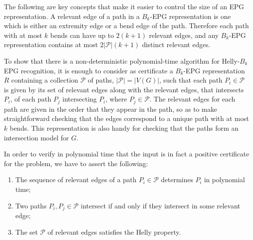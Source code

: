 \documentclass[
submission
]{dmtcs-episciences}
\begin{document}


The following are key concepts that make it easier to control the size of an EPG representation. A relevant edge of a path in a $B_k$-EPG representation is one which is either an extremity edge or a bend edge of the path. Therefore each path with at most $k$ bends can have up to $2(k + 1)$ relevant edges, and any $B_k$-EPG representation contains at most $2|\mathcal{P}|(k + 1)$ distinct relevant edges. 

To show that there is a non-deterministic polynomial-time algorithm for {\sc Helly-$B_k$ EPG recognition}, it is enough to consider as certificate a  $B_k$-EPG representation $R$ containing a collection $\mathcal{P}$ of paths, $|\mathcal{P}| = |V(G)|$, such that  each path $P_i \in \mathcal{P}$ is given by its set of relevant edges along with the relevant edges, that intersects $P_i$, of each path $P_j$ intersecting $P_i$, where $P_j \in \mathcal{P}$.  The relevant edges for each path are given in the order that they appear in the path, so as to make straightforward checking that the edges correspond to a unique path with at most $k$ bends.  This representation is also handy for checking that the paths form an intersection model for $G$.

In order to verify in polynomial time that the input is in fact a positive certificate for the problem, we have to assert the following:

\begin{enumerate}[label=(\roman*)]
\item The sequence of relevant edges of a path $P_i\in \mathcal{P}$ determines $P_i$ in polynomial time; \label{it:bullet1}

\item Two paths $P_i, P_j \in \mathcal{P}$ intersect if and only if they intersect in some relevant edge; \label{it:bullet2}

\item The set $\mathcal{P}$ of relevant edges satisfies the Helly property.  \label{it:bullet3}
\end{enumerate}
\end{document}
